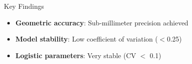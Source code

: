 \documentclass[aspectratio=43]{beamer}
\begin{document}
\begin{frame}
\begin{columns}
\begin{column}{0.5\textwidth}
            \begin{alertblock}{Key Findings}
                \scriptsize
                \begin{itemize}
                    \item \textbf{Geometric accuracy}: Sub-millimeter precision achieved
                    \item \textbf{Model stability}: Low coefficient of variation (\ensuremath{<}0.25)
                    \item \textbf{Logistic parameters}: Very stable (CV \ensuremath{<} 0.1)
                \end{itemize}
            \end{alertblock}
        \end{column}
    \end{columns}
\end{frame}
\end{document}
